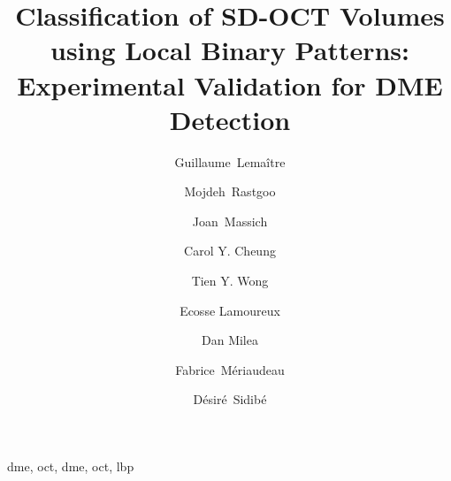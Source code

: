 \title{Classification of SD-OCT Volumes using Local Binary Patterns: Experimental Validation for DME Detection}


\author[le2i,vicorob]{Guillaume~Lema\^itre}
\author[le2i,vicorob]{Mojdeh~Rastgoo}
\author[le2i]{Joan~Massich}
\author[seri]{Carol Y. Cheung}
\author[seri]{Tien Y. Wong}
\author[seri]{Ecosse Lamoureux}
\author[seri]{Dan Milea}
\author[le2i]{Fabrice~M\'eriaudeau}
\author[le2i]{D\'esir\'e~Sidib\'e}

\address[vicorob]{ViCOROB, Universitat de Girona, Campus Montilivi, Edifici P4, 17071 Girona, Spain}
\address[Le2i]{LE2I UMR6306, CNRS, Arts et M\'etiers, Univ. Bourgogne Franche-Comt\'e, 12 rue de la Fonderie, 71200 Le Creusot, France}
\address[seri]{Singaore Eye Research Institute, Singapore National Eye Center, Singapore}
\begin{abstract}
\acresetall  %
%
\end{abstract}

\begin{keyword}
\acl{dme}, \acl{oct}, \acs{dme}, \acs{oct}, \ac{lbp}
\end{keyword}
